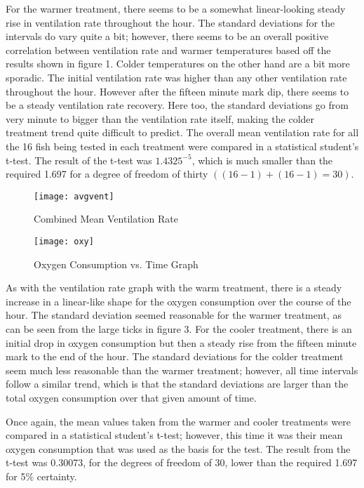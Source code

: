 \documentclass[11pt]{article}
\newcommand\spacer[1][5px]{\vspace{#1}}
\begin{document}
\spacer\spacer

{\normalsize
For the warmer treatment, there seems to be a somewhat linear-looking steady rise in ventilation rate throughout the hour. The standard deviations for the intervals do vary quite a bit; however, there seems to be an overall positive correlation between ventilation rate and warmer temperatures based off the results shown in figure 1. Colder temperatures on the other hand are a bit more sporadic. The initial ventilation rate was higher than any other ventilation rate throughout the hour. However after the fifteen minute mark dip, there seems to be a steady ventilation rate recovery. Here too, the standard deviations go from very minute to bigger than the ventilation rate itself, making the colder treatment trend quite difficult to predict. 
\spacer
The overall mean ventilation rate for all the 16 fish being tested in each treatment were compared in a statistical student’s t-test. The result of the t-test was $1.4325^{-5}$, which is much smaller than the required 1.697 for a degree of freedom of thirty $((16-1) + (16-1) = 30)$. }

\spacer\spacer

\begin{figure}[H]
\centering
\texttt{[image: avgvent]}
\caption{Combined Mean Ventilation Rate}
\end{figure}

\spacer\spacer

\begin{figure}[H]
\centering
\texttt{[image: oxy]}
\caption{Oxygen Consumption vs. Time Graph}
\end{figure}

\spacer\spacer

{\normalsize As with the ventilation rate graph with the warm treatment, there is a steady increase in a linear-like shape for the oxygen consumption over the course of the hour. The standard deviation seemed reasonable for the warmer treatment, as can be seen from the large ticks in figure 3. For the cooler treatment, there is an initial drop in oxygen consumption but then a steady rise from the fifteen minute mark to the end of the hour. The standard deviations for the colder treatment seem much less reasonable than the warmer treatment; however, all time intervals follow a similar trend, which is that the standard deviations are larger than the total oxygen consumption over that given amount of time.

Once again, the mean values taken from the warmer and cooler treatments were compared in a statistical student’s t-test; however, this time it was their mean oxygen consumption that was used as the basis for the test. The result from the t-test was 0.30073, for the degrees of freedom of 30, lower than the required 1.697 for 5\% certainty. 
}
\end{document}
